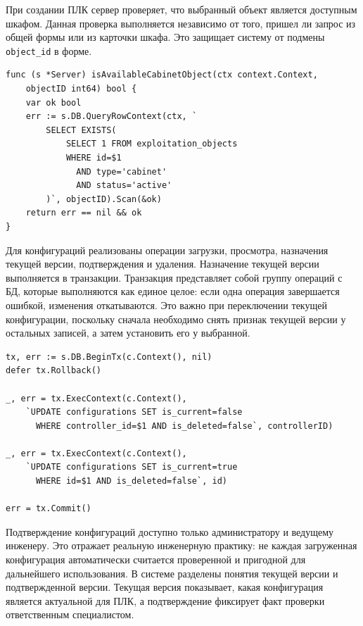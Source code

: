 При создании ПЛК сервер проверяет, что выбранный объект является доступным шкафом. Данная проверка выполняется независимо от того, пришел ли запрос из общей формы или из карточки шкафа. Это защищает систему от подмены \texttt{object\_id} в форме.

\begin{samepage}
\begin{lstlisting}[caption={Проверка привязки ПЛК только к шкафу}, label={lst:chapter3_controller_cabinet}]
func (s *Server) isAvailableCabinetObject(ctx context.Context,
    objectID int64) bool {
    var ok bool
    err := s.DB.QueryRowContext(ctx, `
        SELECT EXISTS(
            SELECT 1 FROM exploitation_objects
            WHERE id=$1
              AND type='cabinet'
              AND status='active'
        )`, objectID).Scan(&ok)
    return err == nil && ok
}
\end{lstlisting}
\end{samepage}

Для конфигураций реализованы операции загрузки, просмотра, назначения текущей версии, подтверждения и удаления. Назначение текущей версии выполняется в транзакции. Транзакция представляет собой группу операций с БД, которые выполняются как единое целое: если одна операция завершается ошибкой, изменения откатываются. Это важно при переключении текущей конфигурации, поскольку сначала необходимо снять признак текущей версии у остальных записей, а затем установить его у выбранной.

\begin{samepage}
\begin{lstlisting}[caption={Назначение текущей конфигурации в транзакции}, label={lst:chapter3_current_config}]
tx, err := s.DB.BeginTx(c.Context(), nil)
defer tx.Rollback()

_, err = tx.ExecContext(c.Context(),
    `UPDATE configurations SET is_current=false
      WHERE controller_id=$1 AND is_deleted=false`, controllerID)

_, err = tx.ExecContext(c.Context(),
    `UPDATE configurations SET is_current=true
      WHERE id=$1 AND is_deleted=false`, id)

err = tx.Commit()
\end{lstlisting}
\end{samepage}

Подтверждение конфигураций доступно только администратору и ведущему инженеру. Это отражает реальную инженерную практику: не каждая загруженная конфигурация автоматически считается проверенной и пригодной для дальнейшего использования. В системе разделены понятия текущей версии и подтвержденной версии. Текущая версия показывает, какая конфигурация является актуальной для ПЛК, а подтверждение фиксирует факт проверки ответственным специалистом.

